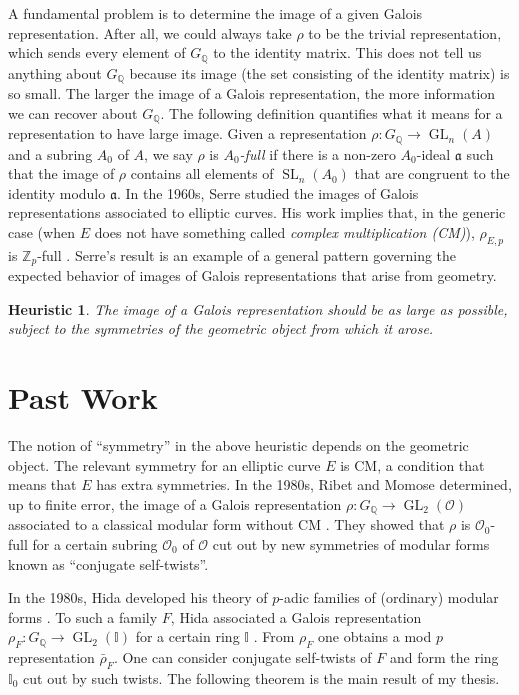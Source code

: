 \documentclass[12pt]{article}
\newcommand{\Aa}{\mathfrak{a}}
\newcommand{\I}{\mathbb{I}}
\newcommand{\OK}{\ensuremath{\mathcal{O}}}
\newcommand{\Q}{\mathbb{Q}}
\newcommand{\Z}{\mathbb{Z}}
\newtheorem*{heuristic}{Heuristic}
\theoremstyle{definition}
\DeclareMathOperator{\GL}{GL}
\DeclareMathOperator{\SL}{SL}
\begin{document}
A fundamental problem is to determine the image of a given Galois representation.  After all, we could always take $\rho$ to be the trivial representation, which sends every element of $G_\Q$ to the identity matrix.  This does not tell us anything about $G_\Q$ because its image (the set consisting of the identity matrix) is so small.  The larger the image of a Galois representation, the more information we can recover about $G_\Q$.  The following definition quantifies what it means for a representation to have large image.  Given a representation $\rho : G_\Q \to \GL_n(A)$ and a subring $A_0$ of $A$, we say $\rho$ is \textit{$A_0$-full} if there is a non-zero $A_0$-ideal $\Aa$ such that the image of $\rho$ contains all elements of $\SL_n(A_0)$ that are congruent to the identity modulo $\Aa$.  In the 1960s, Serre studied the images of Galois representations associated to elliptic curves.  His work implies that, in the generic case (when $E$ does not have something called  \textit{complex multiplication (CM)}), $\rho_{E, p}$ is $\Z_p$-full \cite{Serre68}.  Serre's result is an example of a general pattern governing the expected behavior of images of Galois representations that arise from geometry.

\begin{heuristic}
The image of a Galois representation should be as large as possible, subject to the symmetries of the geometric object from which it arose.
\end{heuristic}

\section*{Past Work}

The notion of ``symmetry'' in the above heuristic depends on the geometric object.  The relevant symmetry for an elliptic curve $E$ is CM, a condition that means that $E$ has extra symmetries.  In the 1980s, Ribet and Momose determined, up to finite error, the image of a Galois representation $\rho: G_\Q \to \GL_2(\OK)$ associated to a classical modular form without CM \cite{Momose81, Ribet83}.  They showed that $\rho$ is $\OK_0$-full for a certain subring $\OK_0$ of $\OK$ cut out by new symmetries of modular forms known as ``conjugate self-twists''.  

In the 1980s, Hida developed his theory of $p$-adic families of (ordinary) modular forms \cite{Hida86a}.  To such a family $F$, Hida associated a Galois representation $\rho_F : G_\Q \to \GL_2(\I)$ for a certain ring $\I$ \cite{Hida86b}.  From $\rho_F$ one obtains a mod $p$ representation $\bar{\rho}_F$.  One can consider conjugate self-twists of $F$ and form the ring $\I_0$ cut out by such twists.  The following theorem is the main result of my thesis.
\end{document}
